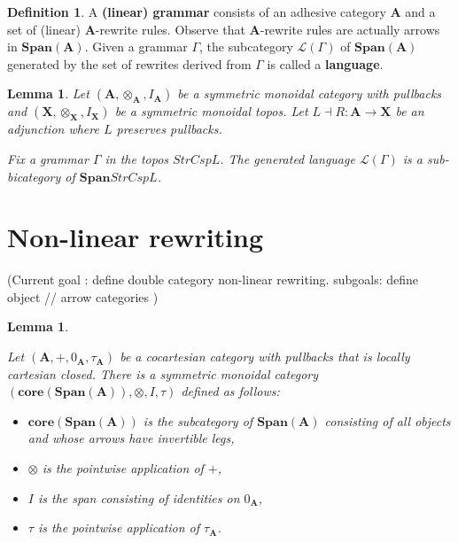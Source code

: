 \documentclass[]{amsart}
\newcommand{\A}{\cat{A}}
\newcommand{\X}{\cat{X}}
\newcommand{\core}{\mathbf{core}}
\newcommand{\defn}[1]{\textbf{#1}}
\newcommand{\cat}[1]{\mathbf{#1}}
\newcommand{\from}{\colon}
\newcommand{\Span}{\mathbf{Span}}
\newcommand{\edit}[1]{\textcolor{editcolour}{(#1)}}
\newtheorem{lemma}[theorem]{Lemma}
\theoremstyle{remark}
\theoremstyle{definition}
\newtheorem{definition}[theorem]{Definition}
\begin{document}
\begin{definition} \label{df_rw_grammar-and-language} A \defn{(linear)
    grammar} consists of an adhesive category $ \A $ and a set of
  (linear) $ \A $-rewrite rules.  Observe that $ \A $-rewrite rules
  are actually arrows in $ \Span (\A) $.  Given a grammar $ \Gamma $,
  the subcategory $ \mathcal{L} ( \Gamma ) $ of $ \Span (\A) $
  generated by the set of rewrites derived from $ \Gamma $ is called a
  \defn{language}.
\end{definition}

\begin{lemma} \label{thm_rw_open-objects-language} Let
  $ (\A , \otimes_{\A} , I_{\A}) $ be a symmetric monoidal category
  with pullbacks and $ (\X , \otimes_{\X} , I_{\X}) $ be a symmetric
  monoidal topos.  Let $ L \dashv R \from \A \to \X $ be an adjunction
  where $ L $ preserves pullbacks.
	
  Fix a grammar $ \Gamma $ in the topos $ StrCsp{L} $.  The generated
  language $ \mathcal{L}(\Gamma) $ is a sub-bicategory of
  $ \Span StrCsp {L} $.
\end{lemma}


\section{Non-linear rewriting} \label{sec:non-linear-rewriting}

\edit{Current goal : define double category non-linear
  rewriting. subgoals: define object // arrow categories }

\begin{lemma} \label{thm_dbl-rewr-obcat}

  Let $ (\A , + , 0_\A , \tau_\A ) $ be a cocartesian category with
  pullbacks that is locally cartesian closed. There is a symmetric
  monoidal category $ ( \core (\Span (\A)) , \otimes , I , \tau ) $
  defined as follows:

  \begin{itemize}
    \item $ \core (\Span (\A)) $ is the subcategory of $ \Span (\A) $
      consisting of all objects and whose arrows have invertible legs,
    \item $ \otimes $ is the pointwise application of $ + $,
    \item $ I $ is the span consisting of identities on $ 0_{\A} $,
    \item $ \tau $ is the pointwise application of $ \tau_{\A} $.
  \end{itemize}
    
\end{lemma}
\end{document}
